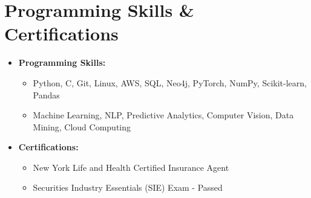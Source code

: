\section*{Programming Skills \& Certifications}
\begin{itemize}[leftmargin=*]
    \item \textbf{Programming Skills:}
    \begin{itemize}
        \item Python, C, Git, Linux, AWS, SQL, Neo4j, PyTorch, NumPy, Scikit-learn, Pandas
        \item Machine Learning, NLP, Predictive Analytics, Computer Vision, Data Mining, Cloud Computing
    \end{itemize}
    \item \textbf{Certifications:}
    \begin{itemize}
        \item New York Life and Health Certified Insurance Agent
        \item Securities Industry Essentials (SIE) Exam - Passed
    \end{itemize}
\end{itemize}